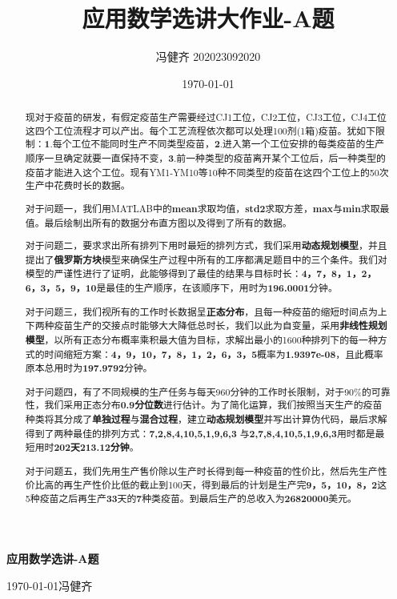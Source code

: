 \documentclass{ctexart}
\title{\textbf{应用数学选讲大作业-A题}}
\author{冯健齐 202023092020}
\date{\today}
\begin{document}
\begin{center}
    \LARGE \textbf{应用数学选讲-A题}\par
    \vspace{1em}
    \normalsize \today \quad 冯健齐 
\end{center}
\begin{abstract}
\normalsize 现对于疫苗的研发，有假定疫苗生产需要经过CJ1工位，CJ2工位，CJ3工位，CJ4工位这四个工位流程才可以产出。每个工艺流程依次都可以处理100剂(1箱)疫苗。犹如下限制：\textbf{1}.每个工位不能同时生产不同类型疫苗，\textbf{2}.进入第一个工位安排的每类疫苗的生产顺序一旦确定就要一直保持不变，\textbf{3}.前一种类型的疫苗离开某个工位后，后一种类型的疫苗才能进入这个工位。现有YM1-YM10等10种不同类型的疫苗在这四个工位上的50次生产中花费时长的数据。 \par
对于问题一，我们用MATLAB中的\textbf{mean}求取均值，\textbf{std2}求取方差，\textbf{max}与\textbf{min}求取最值。最后绘制出所有的数据分布直方图以及得到了所有的数据。 \par
对于问题二，要求求出所有排列下用时最短的排列方式，我们采用\textbf{动态规划模型}，并且提出了\textbf{俄罗斯方块}模型来确保生产过程中所有的工序都满足题目中的三个条件。我们对模型的严谨性进行了证明，此能够得到了最佳的结果与目标时长：\textbf{4，7，8，1，2，6，3，5，9，10}是最佳的生产顺序，在该顺序下，用时为\textbf{196.0001}分钟。 \par
对于问题三，我们视所有的工作时长数据呈\textbf{正态分布}，且每一种疫苗的缩短时间点为上下两种疫苗生产的交接点时能够大大降低总时长，我们以此为自变量，采用\textbf{非线性规划模型}，以所有正态分布概率乘积最大值为目标，求解出最小的1600种排列下的每一种方式的时间缩短方案：\textbf{4，9，10，7，8，1，2，6，3，5}概率为\textbf{1.9397e-08}，且此概率原本总用时为\textbf{197.9792}分钟。\par
对于问题四，有了不同规模的生产任务与每天960分钟的工作时长限制，对于90\%的可靠性，我们采用正态分布\textbf{0.9分位数}进行估计。为了简化运算，我们按照当天生产的疫苗种类将其分成了\textbf{单独过程}与\textbf{混合过程}，建立\textbf{动态规划模型}并写出计算伪代码，最后求解得到了两种最佳的排列方式：\textbf{7,2,8,4,10,5,1,9,6,3} 与\textbf{2,7,8,4,10,5,1,9,6,3}用时都是最短用时\textbf{202天213.12分钟}。\par
对于问题五，我们先用生产售价除以生产时长得到每一种疫苗的性价比，然后先生产性价比高的再生产性价比低的截止到100天，得到最后的计划是生产完\textbf{9，5，10，8，2}这5种疫苗之后再生产\textbf{33}天的\textbf{7}种类疫苗。到最后生产的总收入为\textbf{26820000}美元。\par
\vspace{1em}
\end{abstract}
\thispagestyle{empty}
 \newpage
{}
\setcounter{page}{0}
\tableofcontents
\newpage
\setcounter{page}{1}
\newpage
\end{document}
